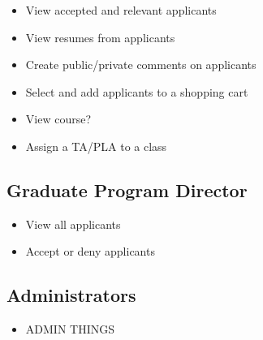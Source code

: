 \documentclass[11pt]{amsart}
\begin{document}
\begin{itemize}
    \item{View accepted and relevant applicants}
    \item{View resumes from applicants}
    \item{Create public/private comments on applicants}
    \item{Select and add applicants to a shopping cart}
    \item{View course?}
    \item{Assign a TA/PLA to a class}
\end{itemize}

\subsection{Graduate Program Director}

\begin{itemize}
    \item{View all applicants}
    \item{Accept or deny applicants}
\end{itemize}

\subsection{Administrators}

\begin{itemize}
    \item{ADMIN THINGS}
\end{itemize}
\end{document}
